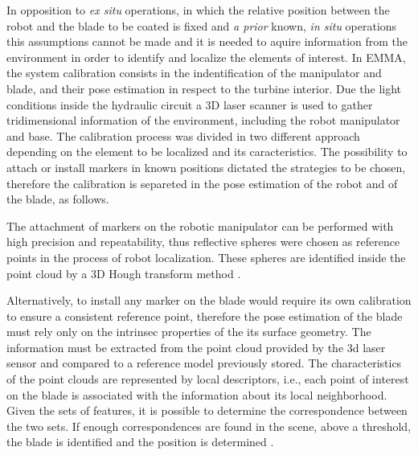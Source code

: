 In opposition to \textit{ex situ} operations, in which the relative position
between the robot and the blade to be coated is fixed and \textit{a prior}
known, \textit{in situ} operations this assumptions cannot be made and it
is needed to aquire information from the environment in order to identify
and localize the elements of interest. In EMMA, the system calibration consists
in the indentification of the manipulator and blade, and their
pose estimation in respect to the turbine interior. Due the light conditions
inside the hydraulic circuit  a 3D laser scanner is used to gather
tridimensional information of the environment, including the robot manipulator
and base. The calibration process was divided in two different approach
depending on the element to be localized and its caracteristics. The possibility
to attach or install markers in known positions dictated the strategies to be
chosen, therefore the calibration is separeted in the pose estimation of the
robot and of the blade, as follows.
 
The attachment of markers on the robotic manipulator can be performed with high
precision and repeatability, thus reflective spheres were chosen as reference
points in the process of robot localization. These spheres are identified inside
the point cloud by a 3D Hough transform method \cite{camurri20143d}.

Alternatively, to install any marker on the
blade would require its own calibration to ensure a consistent reference point,
therefore the pose estimation of the blade must rely only on the intrinsec
properties of the its surface geometry. The information must be extracted from
the point cloud provided by the 3d laser sensor and compared to a reference
model previously stored. The characteristics of the point clouds are represented
by local descriptors, i.e., each point of interest on the blade is associated
with the information about its local neighborhood. Given the
sets of features,  it is possible to determine the correspondence between the
two sets. If enough correspondences are found in the scene, above a threshold,
the blade is identified and the position is determined \cite{Tombari2010a}. 

